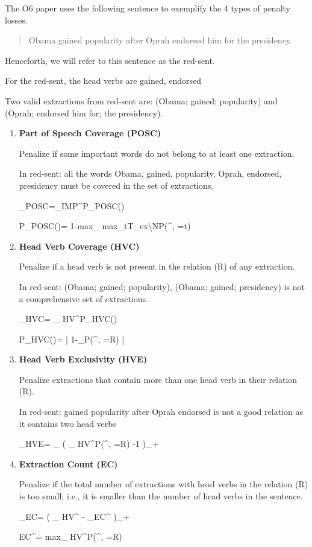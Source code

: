 The O6 paper uses the following sentence
to exemplify the 4 types
of penalty losses. 

\begin{quote}\color{red}
Obama gained popularity after
Oprah endorsed him for the presidency.
\end{quote}
Henceforth, we will refer to
this sentence as the red-sent.

For the red-sent, the head verbs are {\color{red} gained, endorsed}

Two valid extractions from red-sent are:
{\color{red}(Obama; gained; popularity)}
and {\color{red}(Oprah; endorsed him for;
 the presidency)}.


\begin{enumerate}

\item {\bf Part of Speech Coverage (POSC)}

Penalize if 
some important words do not belong to at least one extraction.

In red-sent: all the words {\color{red}Obama, gained, popularity,
Oprah, endorsed, presidency} must be covered in
the set of extractions.

\beq
\call_{POSC}=\sum_{\alp\in [\ell]}IMP^{\alp}P_{POSC}(\alp)
\eeq

\beq
P_{POSC}(\alp)=
1-{\rm max}_{\mu\in [M]}
{\rm max}_{t\in T_{ex}\backslash N}P(\rvt^{\mu, \alp}=t)
\eeq

\item {\bf Head Verb Coverage (HVC)}

Penalize if a head verb
is not present in the relation (R) of any extraction.

In red-sent: {\color{red} (Obama;
gained; popularity), (Obama; gained; presidency)} is not a comprehensive set of extractions.

\beq
\call_{HVC}=
\sum_{\alp\in [\ell]}
HV^\alp P_{HVC}(\alp)
\eeq

\beq
P_{HVC}(\alp)=
\left|
1-\sum_{\mu\in [M]}P(\rvt^{\mu, \alp}=R)
\right|
\eeq

\item {\bf Head Verb Exclusivity (HVE)}

Penalize extractions that 
contain more than one head verb in their relation (R).

In red-sent: {\color{red}gained popularity after Oprah endorsed} is not a good relation as it contains two
head verbs

\beq
\call_{HVE}=
\sum_{\mu\in [M]}
\left(
\sum_{\alp\in [\ell]}
HV^\alp P(\rvt^{\mu, \alp}=R)
-1
\right)_+
\eeq

\item {\bf Extraction Count (EC)}

Penalize if the total number of extractions with head verbs in the relation (R) 
is too small; i.e., it is smaller
 than the number of head verbs
in the sentence.

\beq
\call_{EC}=
\left(
\sum_{\alp\in[\ell]} HV^\alp
-
\sum_{\mu\in [M]}EC^\mu
\right)_+
\eeq

\beq
EC^\mu=
{\rm max}_{\alp\in [\ell]}
HV^\alp P(\rvt^{\mu, \alp}=R)
\eeq


\end{enumerate}
